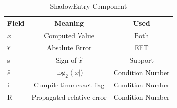 \begin{table}
  \caption{ShadowEntry Component}
  \label{tab:shadowentry}
  \centering
  \begin{tabular}{lcc}
    \toprule
    Field & Meaning & Used\\
    \midrule
    $\hat{x}$ & Computed Value & Both\\
    $\hat{r}$ & Absolute Error & EFT\\
    s & Sign of $\hat{x}$ & Support\\
    $\hat{e}$ & $\log_{2}(\left\lvert x \right\rvert$) & Condition Number\\
    i & Compile-time exact flag & Condition Number\\
    R & Propagated relative error & Condition Number\\
  \bottomrule
\end{tabular}
\end{table}